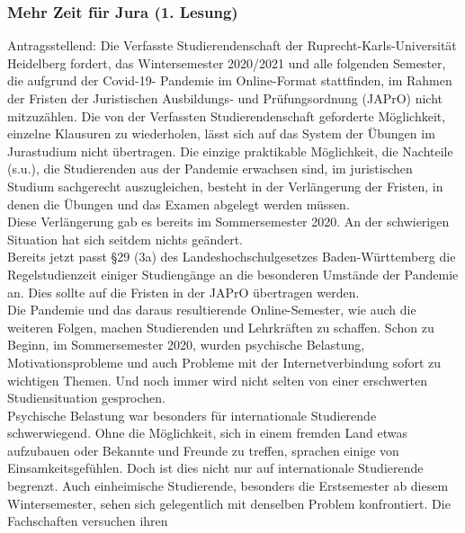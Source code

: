         \subsubsection{Mehr Zeit für Jura  \label{corona:3.3} (1. Lesung)}
        Antragsstellend: 
            Die Verfasste Studierendenschaft der Ruprecht-Karls-Universität Heidelberg fordert,
            das
            Wintersemester 2020/2021 und alle folgenden Semester, die aufgrund der Covid-19-
            Pandemie im
            Online-Format stattfinden, im Rahmen der Fristen der Juristischen Ausbildungs- und
            Prüfungsordnung (JAPrO) nicht mitzuzählen.
        Die von der Verfassten Studierendenschaft geforderte Möglichkeit, einzelne Klausuren zu
        wiederholen, lässt sich auf das System der Übungen im Jurastudium nicht übertragen. Die einzige
        praktikable Möglichkeit, die Nachteile (s.u.), die Studierenden aus der Pandemie erwachsen sind,
        im juristischen Studium sachgerecht auszugleichen, besteht in der Verlängerung der Fristen, in
        denen die Übungen und das Examen abgelegt werden müssen.\\
        Diese Verlängerung gab es bereits im Sommersemester 2020. An der schwierigen Situation hat sich
        seitdem nichts geändert.\\
        Bereits jetzt passt §29 (3a) des Landeshochschulgesetzes Baden-Württemberg die Regelstudienzeit
        einiger Studiengänge an die besonderen Umstände der Pandemie an. Dies sollte auf die Fristen in
        der JAPrO übertragen werden.\\
        Die Pandemie und das daraus resultierende Online-Semester, wie auch die weiteren Folgen, machen
        Studierenden und Lehrkräften zu schaffen. Schon zu Beginn, im Sommersemester 2020, wurden
        psychische Belastung, Motivationsprobleme und auch Probleme mit der Internetverbindung sofort
        zu wichtigen Themen. Und noch immer wird nicht selten von einer erschwerten Studiensituation
        gesprochen.\\
        Psychische Belastung war besonders für internationale Studierende schwerwiegend. Ohne die
        Möglichkeit, sich in einem fremden Land etwas aufzubauen oder Bekannte und Freunde zu treffen,
        sprachen einige von Einsamkeitsgefühlen. Doch ist dies nicht nur auf internationale Studierende
        begrenzt. Auch einheimische Studierende, besonders die Erstsemester ab diesem Wintersemester,
        sehen sich gelegentlich mit denselben Problem konfrontiert. Die Fachschaften versuchen ihren
